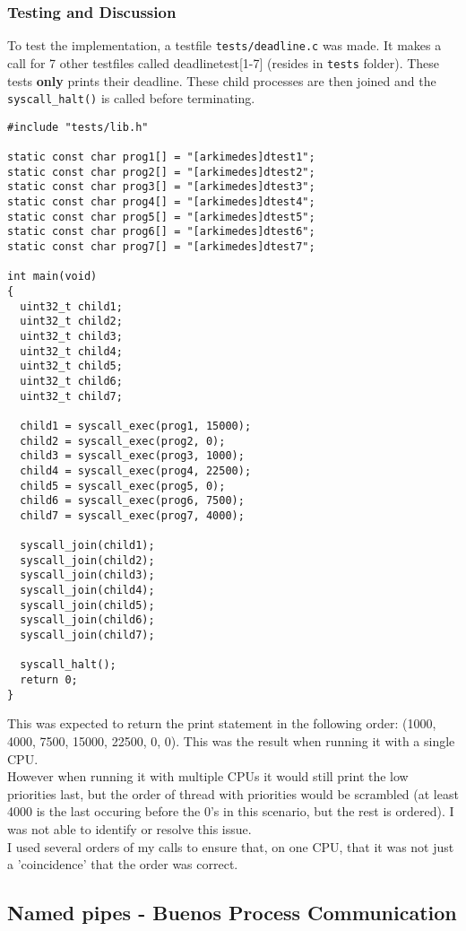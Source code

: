 \documentclass[12pt]{article}
\begin{document}
\subsubsection{Testing and Discussion}
To test the implementation, a testfile \texttt{tests/deadline.c} was made. It makes a call for 7 other testfiles called deadlinetest[1-7] (resides in \texttt{tests} folder). These tests \textbf{only} prints their deadline. These child processes are then joined and the \texttt{syscall\_halt()} is called before terminating.
\begin{verbatim}
#include "tests/lib.h"

static const char prog1[] = "[arkimedes]dtest1";
static const char prog2[] = "[arkimedes]dtest2";
static const char prog3[] = "[arkimedes]dtest3";
static const char prog4[] = "[arkimedes]dtest4";
static const char prog5[] = "[arkimedes]dtest5";
static const char prog6[] = "[arkimedes]dtest6";
static const char prog7[] = "[arkimedes]dtest7";

int main(void)
{
  uint32_t child1;
  uint32_t child2;
  uint32_t child3;
  uint32_t child4;
  uint32_t child5;
  uint32_t child6;
  uint32_t child7;

  child1 = syscall_exec(prog1, 15000);
  child2 = syscall_exec(prog2, 0);
  child3 = syscall_exec(prog3, 1000);
  child4 = syscall_exec(prog4, 22500);
  child5 = syscall_exec(prog5, 0);
  child6 = syscall_exec(prog6, 7500);
  child7 = syscall_exec(prog7, 4000);

  syscall_join(child1);
  syscall_join(child2);
  syscall_join(child3);
  syscall_join(child4);
  syscall_join(child5);
  syscall_join(child6);
  syscall_join(child7);
 
  syscall_halt();
  return 0;
}
\end{verbatim}
This was expected to return the print statement in the following order: (1000, 4000, 7500, 15000, 22500, 0, 0). This was the result when running it with a single CPU. \\
However when running it with multiple CPUs it would still print the low priorities last, but the order of thread with priorities would be scrambled (at least 4000 is the last occuring before the 0's in this scenario, but the rest is ordered). I was not able to identify or resolve this issue. \\
I used several orders of my calls to ensure that, on one CPU, that it was not just a 'coincidence' that the order was correct.  

\subsection{Named pipes - Buenos Process Communication}
\end{document}
